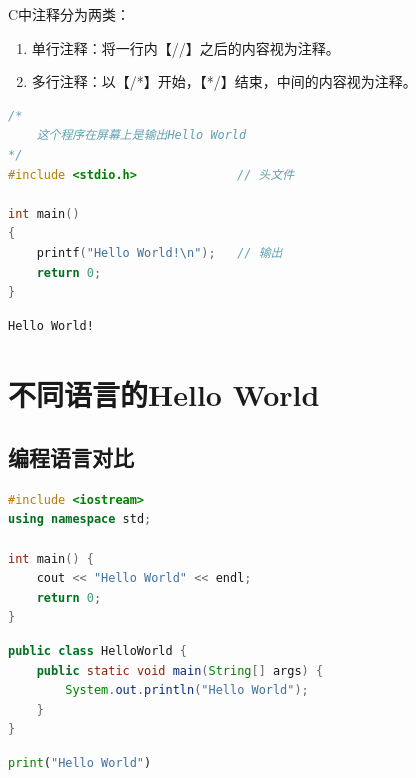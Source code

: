 C中注释分为两类：

\begin{enumerate}
	\item 单行注释：将一行内【//】之后的内容视为注释。
	\item 多行注释：以【/*】开始，【*/】结束，中间的内容视为注释。
\end{enumerate}


\begin{lstlisting}[language=C]
/*
    这个程序在屏幕上是输出Hello World
*/
#include <stdio.h>              // 头文件

int main()
{
    printf("Hello World!\n");   // 输出
    return 0;
}
\end{lstlisting}

\begin{tcolorbox}
	\begin{verbatim}
Hello World!
	\end{verbatim}
\end{tcolorbox}

\newpage

\section{不同语言的Hello World}

\subsection{编程语言对比}


\begin{lstlisting}[language=C++]
#include <iostream>
using namespace std;

int main() {
	cout << "Hello World" << endl;
	return 0;
}
\end{lstlisting}

\vspace{0.5cm}


\begin{lstlisting}[language=Java]
public class HelloWorld {
    public static void main(String[] args) {
        System.out.println("Hello World");
    }
}
\end{lstlisting}

\vspace{0.5cm}


\begin{lstlisting}[language=Python]
print("Hello World")
\end{lstlisting}

\newpage